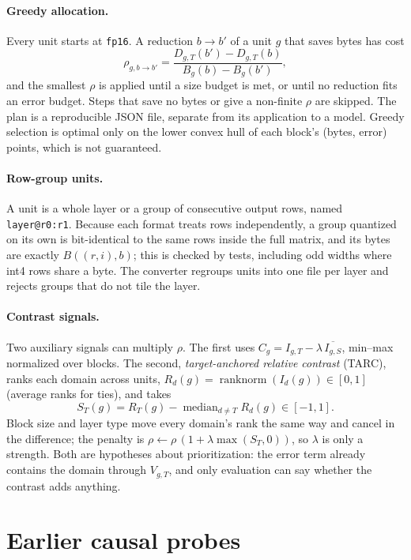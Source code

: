 \documentclass[11pt]{article}
\newcommand{\rn}{\operatorname{ranknorm}}
\newcommand{\med}{\operatorname{median}}
\newcommand{\code}[1]{\texttt{#1}}
\begin{document}
\paragraph{Greedy allocation.}
Every unit starts at \code{fp16}. A reduction $b\to b'$ of a unit $g$ that saves bytes has cost
\begin{equation}
\rho_{g,b\to b'}=\frac{D_{g,T}(b')-D_{g,T}(b)}{B_g(b)-B_g(b')},
\end{equation}
and the smallest $\rho$ is applied until a size budget is met, or until no reduction fits an error budget.
Steps that save no bytes or give a non-finite $\rho$ are skipped. The plan is a reproducible JSON file,
separate from its application to a model. Greedy selection is optimal only on the lower convex hull of each
block's (bytes, error) points, which is not guaranteed.

\paragraph{Row-group units.}
A unit is a whole layer or a group of consecutive output rows, named \code{layer@r0:r1}. Because each format
treats rows independently, a group quantized on its own is bit-identical to the same rows inside the full
matrix, and its bytes are exactly $B((r,i),b)$; this is checked by tests, including odd widths where int4 rows
share a byte. The converter regroups units into one file per layer and rejects groups that do not tile the layer.

\paragraph{Contrast signals.}
Two auxiliary signals can multiply $\rho$. The first uses $C_g=I_{g,T}-\lambda\,\overline{I_{g,S}}$, min--max
normalized over blocks. The second, \emph{target-anchored relative contrast} (TARC), ranks each domain across units,
$R_d(g)=\rn(I_d(g))\in[0,1]$ (average ranks for ties), and takes
\begin{equation}
S_T(g)=R_T(g)-\med_{d\neq T}R_d(g)\in[-1,1].
\end{equation}
Block size and layer type move every domain's rank the same way and cancel in the difference; the penalty is
$\rho\leftarrow\rho\,(1+\lambda\max(S_T,0))$, so $\lambda$ is only a strength. Both are hypotheses about
prioritization: the error term already contains the domain through $V_{g,T}$, and only evaluation can say whether
the contrast adds anything.

\section{Earlier causal probes}
\label{sec:probes}
\end{document}
